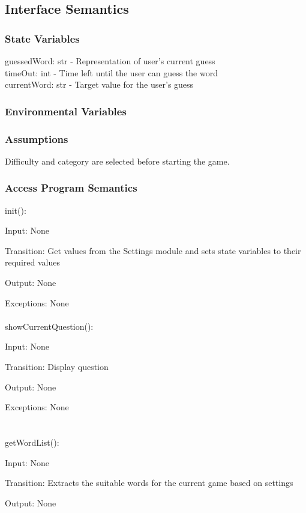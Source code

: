 \documentclass[12,english]{article}
\begin{document}
		\subsection{Interface Semantics}
		\subsubsection{State Variables}
	    guessedWord: str - Representation of user's current guess\\
		timeOut: int - Time left until the user can guess the word\\
		currentWord: str - Target value for the user's guess\\

		\subsubsection{Environmental Variables}
		
		\subsubsection{Assumptions}
    	Difficulty and category are selected before starting the game.\\
		
		\subsubsection{Access Program Semantics}
		init():
		
		Input: None
		
		Transition: Get values from the Settings module and sets state variables to their required values
		
		Output: None
		
		Exceptions: None\\
		\\
		showCurrentQuestion():
		
		Input: None
		
		Transition: Display question
		
		Output: None
		
		Exceptions: None\\
		\\
				\\
		getWordList():
		
		Input: None
		
		Transition: Extracts the suitable words for the current game based on settings
		
		Output: None
		
\end{document}
